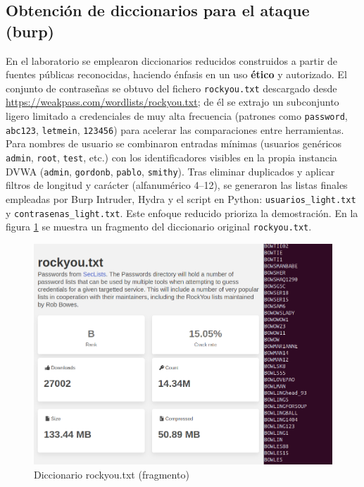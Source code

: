 \documentclass[letterpaper,12pt]{article}
\let\origsubsection\subsection
\renewcommand{\subsection}{\FloatBarrier\origsubsection}
\begin{document}
\subsection{Obtención de diccionarios para el ataque (burp)}
En el laboratorio se emplearon diccionarios reducidos construidos a partir de fuentes públicas reconocidas, haciendo énfasis en un uso \textbf{ético} y autorizado. El conjunto de contraseñas se obtuvo del fichero \texttt{rockyou.txt} descargado desde \url{https://weakpass.com/wordlists/rockyou.txt}; de él se extrajo un subconjunto ligero limitado a credenciales de muy alta frecuencia (patrones como \texttt{password}, \texttt{abc123}, \texttt{letmein}, \texttt{123456}) para acelerar las comparaciones entre herramientas. Para nombres de usuario se combinaron entradas mínimas (usuarios genéricos \texttt{admin}, \texttt{root}, \texttt{test}, etc.) con los identificadores visibles en la propia instancia DVWA (\texttt{admin}, \texttt{gordonb}, \texttt{pablo}, \texttt{smithy}). Tras eliminar duplicados y aplicar filtros de longitud y carácter (alfanumérico 4--12), se generaron las listas finales empleadas por Burp Intruder, Hydra y el script en Python: \texttt{usuarios\_light.txt} y \texttt{contrasenas\_light.txt}. Este enfoque reducido prioriza la demostración. En la figura \ref{fig:rockyouweb} se muestra un fragmento del diccionario original \texttt{rockyou.txt}. 
\begin{figure}
    \centering
    \includegraphics[width=1\linewidth]{Captura desde 2025-10-03 03-13-07.png}
    \caption{Diccionario rockyou.txt (fragmento)}
    \label{fig:rockyouweb}
\end{figure}
\end{document}
